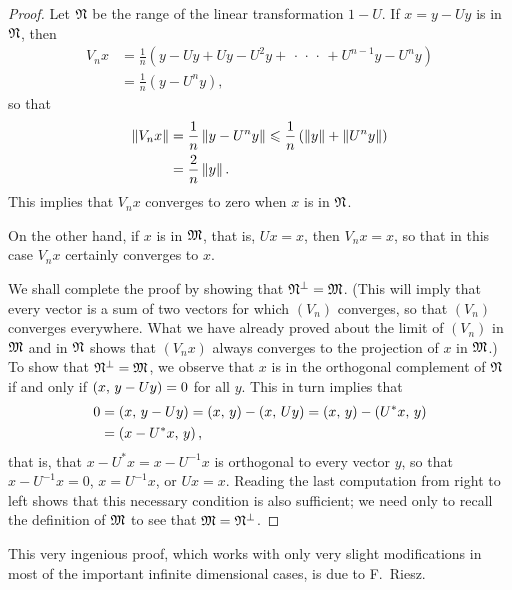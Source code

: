 \begin{proof}
    Let \(\frak{N}\) be the range of the linear transformation \(1 - U\). If \(x = y - Uy\) is in \(\frak{N}\), then
    \begin{align*}
        V_n x &= \frac{1}{n}(y - Uy + Uy - U^2y + \,\cdot\,\cdot\,\cdot\, + 
        U^{n-1}y - U^n y)\\
        &= \frac{1}{n} (y - U^n y),
    \end{align*}
    so that
    \begin{align*}
        \left\lVert V_n x\right\rVert &= \frac{1}{n} \left\lVert y - U^n y\right\rVert \leqslant \frac{1}{n}
        \left(\left\lVert y\right\rVert + \left\lVert U^n y\right\rVert\right)\\
        & = \frac{2}{n} \left\lVert y\right\rVert.
    \end{align*}
    This implies that \(V_n x\) converges to zero when \(x\) is in \(\frak{N}\).

    On the other hand, if \(x\) is in \(\mathfrak{M}\), that is, \(Ux = x\), then
    \(V_n x = x\), so that in this case \(V_n x\) certainly converges to \(x\).

    We shall complete the proof by showing that \(\frak{N}^{\perp} = \mathfrak{M}\).
    (This will imply that every vector is a sum of two vectors for which
    \((V_n)\) converges, so that \((V_n)\) converges everywhere. What we have
    already proved about the limit of \((V_n)\) in \(\mathfrak{M}\) and in
    \(\frak{N}\) shows that \((V_n x)\) always converges to the projection of
    \(x\) in \(\mathfrak{M}\).) To show that \(\frak{N}^{\perp} = \mathfrak{M}\), we observe
    that \(x\) is in the orthogonal complement of \(\frak{N}\) if and only if
    \(\left(x,\,y - Uy\right) = 0\) for all \(y\). This in turn implies that
    \begin{align*}
        0 & = \left(x,\,y - Uy\right) = \left(x,\,y\right) - \left(x,\,Uy\right) = \left(x,\,y\right) - \left(U^*x,\,y\right) \\
        & = \left(x - U^*x,\,y\right),
    \end{align*}
    that is, that \(x - U^* x = x - U^{-1}x\) is orthogonal to every vector
    \(y\), so that \(x - U^{-1}x = 0\), \(x = U^{-1}x\), or \(Ux = x\). Reading
    the last computation from right to left shows that this necessary condition
    is also sufficient; we need only to recall the definition of \(\mathfrak{M}\) to
    see that \(\mathfrak{M} = \frak{N}^{\perp}\).
\end{proof}

This very ingenious proof, which works with only very slight modifications in
most of the important infinite dimensional cases, is due to F.~Riesz.

